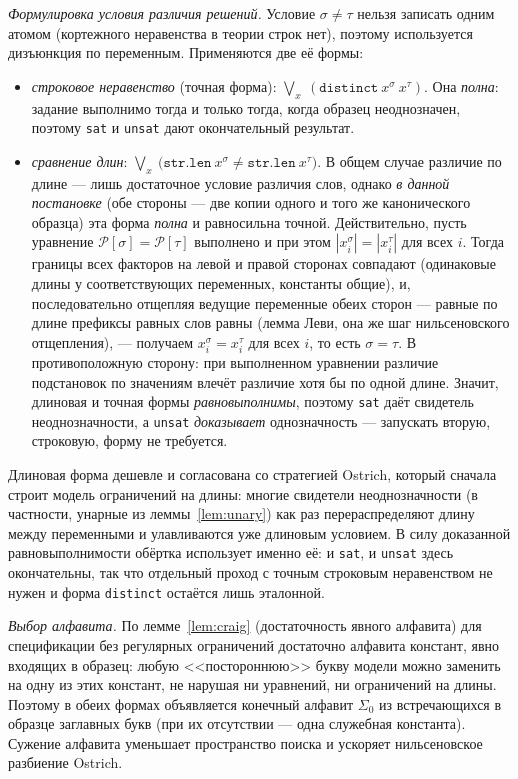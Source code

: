 \documentclass[14pt, russian]{scrartcl}
\begin{document}
\textit{Формулировка условия различия решений.} Условие $\sigma \neq \tau$ нельзя записать
одним атомом (кортежного неравенства в теории строк нет), поэтому используется дизъюнкция
по переменным. Применяются две её формы:
\begin{itemize}
\item \textit{строковое неравенство} (точная форма):
  $\bigvee_{x}\ (\texttt{distinct}\ x^{\sigma}\ x^{\tau})$. Она \textit{полна}: задание
  выполнимо тогда и только тогда, когда образец неоднозначен, поэтому \texttt{sat} и
  \texttt{unsat} дают окончательный результат.
\item \textit{сравнение длин}:
  $\bigvee_{x}\ \bigl(\texttt{str.len}\ x^{\sigma} \neq \texttt{str.len}\ x^{\tau}\bigr)$.
  В общем случае различие по длине --- лишь достаточное условие различия слов, однако
  \textit{в данной постановке} (обе стороны --- две копии одного и того же канонического
  образца) эта форма \textit{полна} и равносильна точной. Действительно, пусть уравнение
  $\mathcal{P}[\sigma] = \mathcal{P}[\tau]$ выполнено и при этом
  $|x_i^{\sigma}| = |x_i^{\tau}|$ для всех $i$. Тогда границы всех факторов на левой и
  правой сторонах совпадают (одинаковые длины у соответствующих переменных, константы
  общие), и, последовательно отщепляя ведущие переменные обеих сторон --- равные по длине
  префиксы равных слов равны (лемма Леви, она же шаг нильсеновского отщепления), ---
  получаем $x_i^{\sigma} = x_i^{\tau}$ для всех $i$, то есть $\sigma = \tau$. В
  противоположную сторону: при выполненном уравнении различие подстановок по значениям
  влечёт различие хотя бы по одной длине. Значит, длиновая и точная формы
  \textit{равновыполнимы}, поэтому \texttt{sat} даёт свидетель неоднозначности, а
  \texttt{unsat} \textit{доказывает} однозначность --- запускать вторую, строковую, форму
  не требуется.
\end{itemize}
Длиновая форма дешевле и согласована со стратегией Ostrich, который сначала строит модель
ограничений на длины: многие свидетели неоднозначности (в частности, унарные из
леммы~\ref{lem:unary}) как раз перераспределяют длину между переменными и улавливаются уже
длиновым условием. В силу доказанной равновыполнимости обёртка использует именно её: и
\texttt{sat}, и \texttt{unsat} здесь окончательны, так что отдельный проход с точным
строковым неравенством не нужен и форма \texttt{distinct} остаётся лишь эталонной.

\textit{Выбор алфавита.} По лемме~\ref{lem:craig} (достаточность явного алфавита) для
спецификации без регулярных ограничений достаточно алфавита констант, явно входящих в
образец: любую <<постороннюю>> букву модели можно заменить на одну из этих констант, не
нарушая ни уравнений, ни ограничений на длины. Поэтому в обеих формах объявляется
конечный алфавит $\Sigma_0$ из встречающихся в образце заглавных букв (при их отсутствии
--- одна служебная константа). Сужение алфавита уменьшает пространство поиска и ускоряет
нильсеновское разбиение Ostrich.
\end{document}
